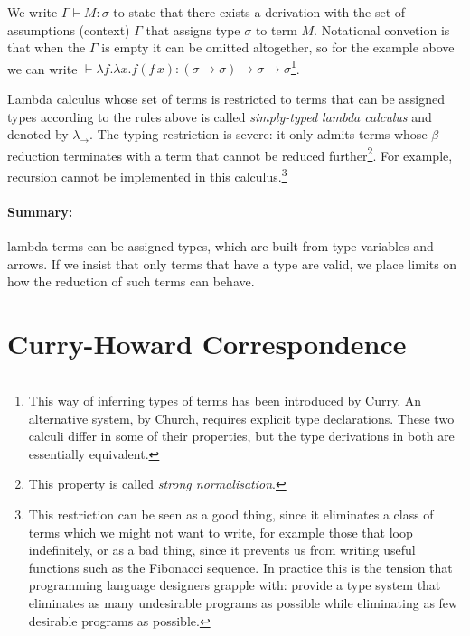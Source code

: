 \documentclass[11pt,twoside,a4paper]{article} %
\begin{document}
We write $\Gamma\vdash M:\sigma$ to state that there exists a derivation with 
the set of assumptions (context) $\Gamma$ that assigns type $\sigma$ to term $M$. 
Notational convetion is that when the $\Gamma$ is empty it
can be omitted altogether, so for the example above we can write
$\vdash \lambda f.\lambda
x.f(f\,x):(\sigma\rightarrow\sigma)\rightarrow\sigma\rightarrow\sigma$\footnote{This
way of inferring types of terms has been introduced by Curry. An alternative
system, by Church, requires explicit type declarations. These two calculi
differ in some of their properties, but the type derivations in both are essentially
equivalent\cite{su99}.}.

Lambda calculus whose set of terms is restricted to terms that can be
assigned types according to the rules above is called \emph{simply-typed lambda
calculus} and denoted by $\lambda_\rightarrow$. The typing restriction is
severe: it only admits terms whose $\beta$-reduction terminates with a term that 
cannot be reduced further\footnote{This property is called \emph{strong normalisation}.}. 
For example, recursion
cannot be implemented in this calculus.\footnote{This restriction can be seen as a good
thing, since it eliminates a class of terms which we might not want to write, for
example those that loop indefinitely, or as a bad thing, since it prevents us
from writing useful functions such as the Fibonacci sequence. In practice this
is the tension that programming language designers grapple with: provide a type
system that eliminates as many undesirable programs as possible while
eliminating as few desirable programs as possible.}

\paragraph{Summary:} lambda terms can be assigned types, which are built from
type variables and arrows. If we insist that only terms that have a type are 
valid, we place limits on how the reduction of such terms can behave.

\section{Curry-Howard Correspondence}
\end{document}
